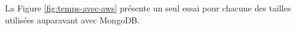 %
%
%	
%		


La Figure \ref{fig:temps-avec-aws} présente un seul essai pour chacune des tailles utilisées auparavant avec MongoDB. 

